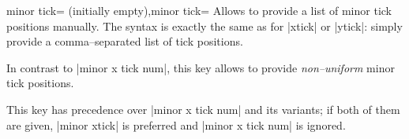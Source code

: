 \begin{pgfplotsxykeylist}{minor \x tick= (initially empty),minor tick=}
	Allows to provide a list of minor tick positions manually. The syntax is exactly the same as for |xtick| or |ytick|: simply provide a comma--separated list of tick positions.

	In contrast to |minor x tick num|, this key allows to provide \emph{non--uniform} minor tick positions.

\begin{codeexample}[]
\end{codeexample}

	This key has precedence over |minor x tick num| and its variants; if both of them are given, |minor xtick| is preferred and |minor x tick num| is ignored.
\end{pgfplotsxykeylist}

